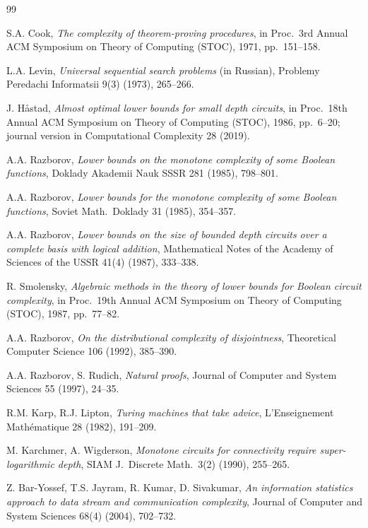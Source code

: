 \documentclass[11pt]{article}
\theoremstyle{definition}
\theoremstyle{remark}
\begin{document}
\begin{thebibliography}{99}

  S.A. Cook,
  \textit{The complexity of theorem-proving procedures},
  in Proc.\ 3rd Annual ACM Symposium on Theory of Computing (STOC), 1971, pp.\ 151--158.

  L.A. Levin,
  \textit{Universal sequential search problems} (in Russian),
  Problemy Peredachi Informatsii 9(3) (1973), 265--266.

  J. H\aa stad,
  \textit{Almost optimal lower bounds for small depth circuits},
  in Proc.\ 18th Annual ACM Symposium on Theory of Computing (STOC), 1986, pp.\ 6--20;
  journal version in Computational Complexity 28 (2019).

  A.A. Razborov,
  \textit{Lower bounds on the monotone complexity of some Boolean functions},
  Doklady Akademii Nauk SSSR 281 (1985), 798--801.

  A.A. Razborov,
  \textit{Lower bounds for the monotone complexity of some Boolean functions},
  Soviet Math.\ Doklady 31 (1985), 354--357.

  A.A. Razborov,
  \textit{Lower bounds on the size of bounded depth circuits over a complete basis with logical addition},
  Mathematical Notes of the Academy of Sciences of the USSR 41(4) (1987), 333--338.

  R. Smolensky,
  \textit{Algebraic methods in the theory of lower bounds for Boolean circuit complexity},
  in Proc.\ 19th Annual ACM Symposium on Theory of Computing (STOC), 1987, pp.\ 77--82.

  A.A. Razborov,
  \textit{On the distributional complexity of disjointness},
  Theoretical Computer Science 106 (1992), 385--390.

  A.A. Razborov, S. Rudich,
  \textit{Natural proofs},
  Journal of Computer and System Sciences 55 (1997), 24--35.

  R.M. Karp, R.J. Lipton,
  \textit{Turing machines that take advice},
  L'Enseignement Math\'ematique 28 (1982), 191--209.

  M. Karchmer, A. Wigderson,
  \textit{Monotone circuits for connectivity require super-logarithmic depth},
  SIAM J.\ Discrete Math.\ 3(2) (1990), 255--265.

  Z. Bar-Yossef, T.S. Jayram, R. Kumar, D. Sivakumar,
  \textit{An information statistics approach to data stream and communication complexity},
  Journal of Computer and System Sciences 68(4) (2004), 702--732.


\end{thebibliography}
\end{document}
